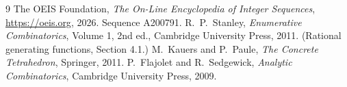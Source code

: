 \documentclass[11pt,a4paper]{article}
\theoremstyle{plain}
\theoremstyle{definition}
\begin{document}
\begin{thebibliography}{9}
 The OEIS Foundation, \emph{The On-Line Encyclopedia of Integer
Sequences}, \url{https://oeis.org}, 2026. Sequence A200791.
 R.~P.~Stanley, \emph{Enumerative Combinatorics}, Volume 1, 2nd ed.,
Cambridge University Press, 2011. (Rational generating functions, Section 4.1.)
 M.~Kauers and P.~Paule, \emph{The Concrete Tetrahedron}, Springer, 2011.
 P.~Flajolet and R.~Sedgewick, \emph{Analytic Combinatorics}, Cambridge
University Press, 2009.
\end{thebibliography}
\end{document}

